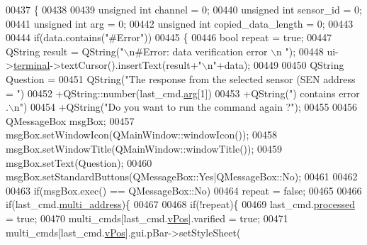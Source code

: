 \begin{DoxyCode}
00437                                                                \{
00438 
00439     \textcolor{keywordtype}{unsigned} \textcolor{keywordtype}{int}  channel               = 0;
00440     \textcolor{keywordtype}{unsigned} \textcolor{keywordtype}{int}  sensor\_id             = 0;
00441     \textcolor{keywordtype}{unsigned} \textcolor{keywordtype}{int}  arg                   = 0;
00442     \textcolor{keywordtype}{unsigned} \textcolor{keywordtype}{int}  copied\_data\_length    = 0;
00443 
00444         \textcolor{keywordflow}{if}(data.contains(\textcolor{stringliteral}{"#Error"}))
00445         \{
00446              \textcolor{keywordtype}{bool} repeat = \textcolor{keyword}{true};
00447              QString result =  QString(\textcolor{stringliteral}{"\(\backslash\)n#Error: data verification error \(\backslash\)n "});
00448              ui->\hyperlink{a00027_aae71c46ea4546df5994735dee573b2dd}{terminal}->textCursor().insertText(result+\textcolor{stringliteral}{"\(\backslash\)n"}+data);
00449 
00450              QString Question =
00451                      QString(\textcolor{stringliteral}{"The response from the selected sensor (SEN address = "})
00452                      +QString::number(last\_cmd.\hyperlink{a00001_a56e6c2d7315d0ae60a51e8b140c9cfe4}{arg}[1])
00453                      +QString(\textcolor{stringliteral}{") contains error .\(\backslash\)n"})
00454                      +QString(\textcolor{stringliteral}{"Do you want to run the command again ?"});
00455 
00456              QMessageBox msgBox;
00457              msgBox.setWindowIcon(QMainWindow::windowIcon());
00458              msgBox.setWindowTitle(QMainWindow::windowTitle());
00459              msgBox.setText(Question);
00460              msgBox.setStandardButtons(QMessageBox::Yes|QMessageBox::No);
00461 
00462 
00463              \textcolor{keywordflow}{if}(msgBox.exec() == QMessageBox::No)
00464                       repeat = \textcolor{keyword}{false};
00465 
00466                  \textcolor{keywordflow}{if}(last\_cmd.\hyperlink{a00001_a8e69b971c61ced27a7567efd2bf0db59}{multi\_address})\{
00467 
00468                      \textcolor{keywordflow}{if}(!repeat)\{
00469                      last\_cmd.\hyperlink{a00001_a3e88f779da9798a5da7dda227e2ca388}{processed} = \textcolor{keyword}{true};
00470                      multi\_cmds[last\_cmd.\hyperlink{a00001_a2b48b371fd84be2a8ad581b1ad708b88}{vPos}].varified = \textcolor{keyword}{true};
00471                      multi\_cmds[last\_cmd.\hyperlink{a00001_a2b48b371fd84be2a8ad581b1ad708b88}{vPos}].gui.pBar->setStyleSheet(

\end{DoxyCode}
